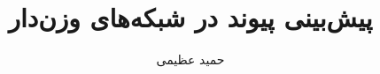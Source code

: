 \usepackage{fancyhdr}
\usepackage{tabularx}
\usepackage{multirow}
\usepackage{setspace}
\usepackage[table]{xcolor}
\usepackage{colortbl}
\usepackage{amsmath}
\usepackage{titlesec}
\usepackage{listings}
\usepackage{adjustbox}
\usepackage[bookmarks]{hyperref}
\usepackage{url}
\usepackage{graphicx}
\usepackage{subcaption}
\usepackage{tikz}
\usetikzlibrary{graphs}

\usepackage{multicol}
\setlength{\columnsep}{1cm}

\usepackage{titlesec,titletoc}
\usepackage{tocbibind}
\usepackage{afterpage}

\usepackage{mathtools,mathabx}


\usepackage{xepersian}





\newfontfamily{}

\title{پیش‌بینی پیوند در شبکه‌های وزن‌دار}
\author{حمید عظیمی}



